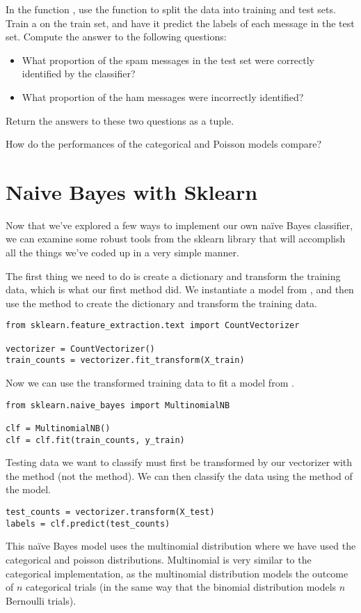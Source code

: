 \begin{problem}
In the function , use the  function to split the data into training and test sets.
Train a  on the train set, and have it predict the labels of each message in the test set.
Compute the answer to the following questions:
\begin{itemize}
\item What proportion of the spam messages in the test set were correctly identified by the classifier?
\item What proportion of the ham messages were incorrectly identified?
\end{itemize}
Return the answers to these two questions as a tuple.

\noindent
How do the performances of the categorical and Poisson models compare?
\end{problem}

\section*{Naive Bayes with Sklearn}
Now that we've explored a few ways to implement our own naïve Bayes classifier, we can examine some robust tools from the sklearn library that will accomplish all the things we've coded up in a very simple manner.

The first thing we need to do is create a dictionary and transform the training data, which is what our first  method did.
We instantiate a  model from , and then use the  method to create the dictionary and transform the training data.
\begin{lstlisting}
from sklearn.feature_extraction.text import CountVectorizer

vectorizer = CountVectorizer()
train_counts = vectorizer.fit_transform(X_train)
\end{lstlisting}
Now we can use the transformed training data to fit a  model from .
\begin{lstlisting}
from sklearn.naive_bayes import MultinomialNB

clf = MultinomialNB()
clf = clf.fit(train_counts, y_train)
\end{lstlisting}
Testing data we want to classify must first be transformed by our vectorizer with the  method (not the  method).
We can then classify the data using the  method of the  model.
\begin{lstlisting}
test_counts = vectorizer.transform(X_test)
labels = clf.predict(test_counts)
\end{lstlisting}
This naïve Bayes model uses the multinomial distribution where we have used the categorical and poisson distributions.
Multinomial is very similar to the categorical implementation, as the multinomial distribution models the outcome of $n$ categorical trials (in the same way that the binomial distribution models $n$ Bernoulli trials).

